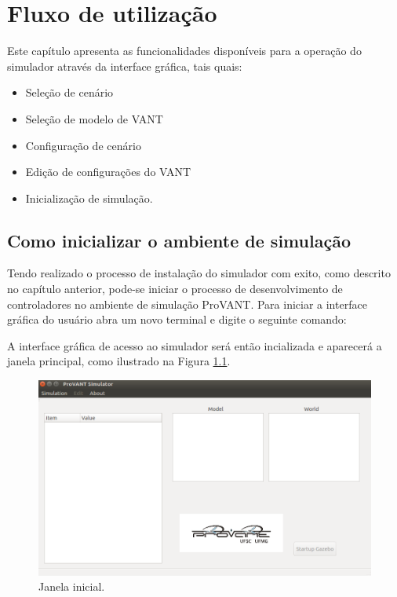 \chapter{Fluxo de utilização}

Este capítulo apresenta as funcionalidades disponíveis para a operação do simulador através da interface gráfica, tais quais:

\begin{itemize}
\setlength{\itemsep}{1pt}
\setlength{\parskip}{0pt}
\setlength{\parsep}{0pt}
\item Seleção de cenário
\item Seleção de modelo de VANT
\item Configuração de cenário
\item Edição de configurações do VANT
\item Inicialização de simulação.
\end{itemize}
 
\section{Como inicializar o ambiente de simulação}

Tendo realizado o processo de instalação do simulador com exito, como descrito no capítulo anterior, pode-se iniciar o processo de desenvolvimento de controladores no ambiente de simulação ProVANT. Para iniciar a interface gráfica do usuário abra um novo terminal e digite o seguinte comando:


A interface gráfica de acesso ao simulador será então incializada e aparecerá a janela principal, como ilustrado na Figura \ref{1}.

\begin{figure}[!ht]
	\centering
	\includegraphics[width=0.8\columnwidth]{figuras/1.png}
	\caption{Janela inicial.}
	\label{1}
\end{figure}

